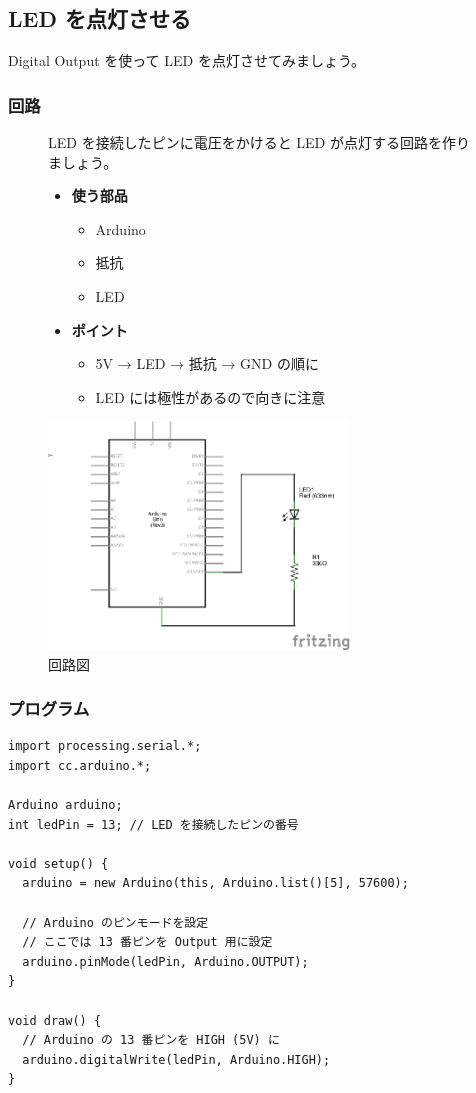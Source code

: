 \documentclass[11pt,a4paper]{jarticle}
\begin{document}
\subsection{LED を点灯させる}
Digital Output を使って LED を点灯させてみましょう。

\subsubsection*{回路}
\begin{figure}[h!]
 \begin{minipage}{0.5\columnwidth}
  LED を接続したピンに電圧をかけると LED が点灯する回路を作りましょう。
  \begin{itemize}
   \item \textbf{使う部品}
	 \begin{itemize}
	  \item Arduino
	  \item 抵抗
	  \item LED
	 \end{itemize}
   \item \textbf{ポイント}
	 \begin{itemize}
	  \item 5V → LED → 抵抗 → GND の順に
	  \item LED には極性があるので向きに注意
	 \end{itemize}
  \end{itemize}
 \end{minipage}
 \begin{minipage}{0.5\columnwidth}
  \centering
  \includegraphics[width=80mm]{img/eps/02_led.eps}
  \caption{回路図}
 \end{minipage}
\end{figure}

\subsubsection*{プログラム}
\begin{lstlisting}
import processing.serial.*;
import cc.arduino.*;
 
Arduino arduino;
int ledPin = 13; // LED を接続したピンの番号
 
void setup() {
  arduino = new Arduino(this, Arduino.list()[5], 57600);

  // Arduino のピンモードを設定
  // ここでは 13 番ピンを Output 用に設定
  arduino.pinMode(ledPin, Arduino.OUTPUT);
}
 
void draw() {
  // Arduino の 13 番ピンを HIGH (5V) に
  arduino.digitalWrite(ledPin, Arduino.HIGH);
}
\end{lstlisting}
\end{document}
